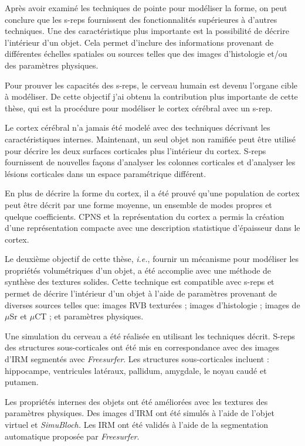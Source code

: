 Après avoir examiné les techniques de pointe pour
modéliser la forme, on peut conclure que
les s-reps fournissent des fonctionnalités supérieures à d'autres techniques.
Une des caractéristique plus importante est la possibilité de décrire l'intérieur d'un objet.
Cela permet d'inclure des informations provenant de différentes échelles spatiales
ou sources telles que des images d'histologie et/ou des paramètres physiques.

Pour prouver les capacités des s-reps,
le cerveau humain est devenu l'organe cible à modéliser.
De cette objectif j'ai obtenu la
contribution plus importante de cette thèse,
qui est la procédure pour modéliser le
cortex cérébral avec un s-rep.

Le cortex cérébral n'a jamais été modelé
avec des techniques décrivant les caractéristiques internes.
Maintenant, un seul objet non ramifiée
peut être utilisé pour décrire les deux surfaces corticales plus l'intérieur du cortex.
S-reps fournissent de nouvelles façons d'analyser les colonnes corticales et d'analyser 
les lésions corticales dans un espace paramétrique différent.

En plus de décrire la forme du cortex, il a été prouvé
qu'une population de cortex peut être décrit par une forme moyenne, un ensemble de modes propres
et quelque coefficients. CPNS et la représentation du cortex
a permis la création d'une représentation compacte 
avec une description statistique d'épaisseur dans le cortex.

Le deuxième objectif de cette thèse, \textit{i.e.},
fournir un mécanisme pour modéliser les propriétés volumétriques d'un objet,
a été accomplie avec une méthode de synthèse des textures solides.
Cette technique est compatible avec s-reps et
permet de décrire l'intérieur d'un objet à l'aide de paramètres provenant de diverses sources telles que:
images RVB texturées ; images d'histologie ; images de $\mu$Sr et $\mu$CT ; et paramètres physiques.

Une simulation du cerveau a été réalisée en utilisant les techniques décrit.
S-reps des structures sous-corticales ont été mis en correspondance
avec des images d'IRM segmentés avec \textit{Freesurfer}.
Les structures sous-corticales incluent : hippocampe, ventricules latéraux, pallidum, amygdale, le noyau caudé et putamen.

Les propriétés internes des objets ont été améliorées
avec les textures des paramètres physiques.
Des images d'IRM ont été simulés à l'aide de l'objet virtuel et \textit{SimuBloch.}
Les IRM ont été validés à l'aide de la segmentation automatique proposée par \textit{Freesurfer}.

